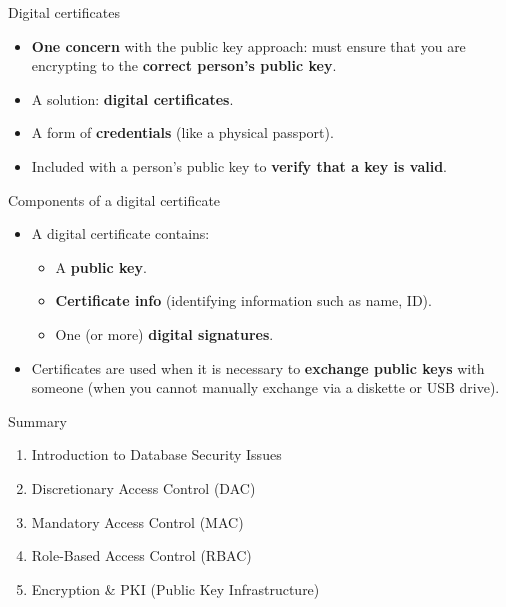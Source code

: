 \begin{frame}{Digital certificates}
    \Large
    \begin{itemize}
        \item \textbf{One concern} with the public key approach: must ensure that you are encrypting to the \textbf{correct person's public key}.
        
        \vspace{0.3cm}
        \item A solution: \textbf{digital certificates}.
        
        \vspace{0.3cm}
        \item A form of \textbf{credentials} (like a physical passport).
        
        \item Included with a person's public key to \textbf{verify that a key is valid}.
    \end{itemize}
\end{frame}

\begin{frame}{Components of a digital certificate}
    \Large
    \begin{itemize}
        \item A digital certificate contains:
        \begin{itemize}
            \large
            \setlength{\itemsep}{0.2cm}
            \item A \textbf{public key}.
            \item \textbf{Certificate info} (identifying information such as name, ID).
            \item One (or more) \textbf{digital signatures}.
        \end{itemize}
        
        \vspace{0.5cm}
        \item Certificates are used when it is necessary to \textbf{exchange public keys} with someone (when you cannot manually exchange via a diskette or USB drive).
    \end{itemize}
\end{frame}

\begin{frame}{Summary}
    \Large
    \begin{enumerate}
        \setlength{\itemsep}{0.4cm}
        \item Introduction to Database Security Issues
        \item Discretionary Access Control (DAC)
        \item Mandatory Access Control (MAC)
        \item Role-Based Access Control (RBAC)
        \item Encryption \& PKI (Public Key Infrastructure)
    \end{enumerate}
\end{frame}